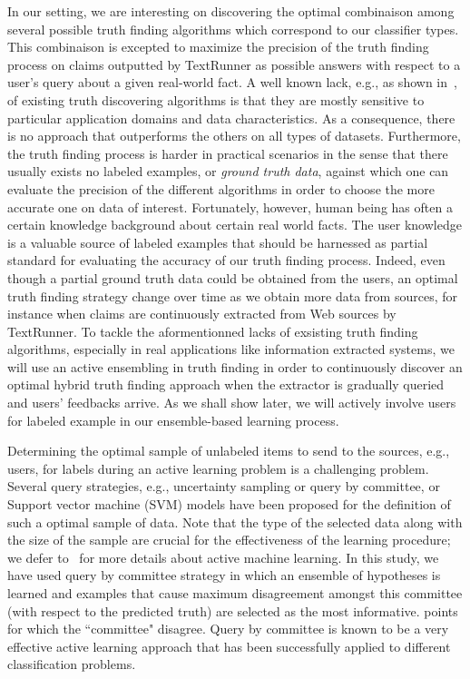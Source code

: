 In our setting, we are interesting on discovering the optimal combinaison among several possible truth finding algorithms
which correspond to our classifier types.
This combinaison is excepted to maximize the precision of the truth finding process on claims outputted by TextRunner as 
possible answers with respect to a user's query about a given real-world fact.
A well known lack, e.g., as shown in~\cite{Li12, Wagui14}, of existing truth discovering algorithms is that they are mostly sensitive
to particular application domains and data characteristics. As a consequence, there is no approach that outperforms the others on all 
types of datasets. Furthermore, the truth finding process is harder in practical scenarios in the sense that there usually exists
no labeled examples, or \emph{ground truth data}, against which one can evaluate the precision of the different algorithms in order to choose
the more accurate one on data of interest.  Fortunately, however, human being has often a certain knowledge background about certain real world facts.
The user knowledge is a valuable source of labeled examples that should be harnessed as partial standard for evaluating the accuracy of our truth finding 
process. Indeed, even though a partial ground truth data could be obtained from the users, an optimal truth finding strategy change over time as we obtain
more data from sources, for instance when claims are continuously extracted from Web sources by TextRunner.
To tackle the aformentionned lacks of exsisting truth finding algorithms, especially in real applications like information extracted systems, 
we will use an active ensembling in truth finding in order to continuously discover an optimal hybrid truth finding approach when the extractor is gradually
queried and users' feedbacks arrive. As we shall show later, we will actively involve users for labeled example in our ensemble-based learning process.

Determining the optimal sample of unlabeled items to send to the sources, e.g., users, for labels during an active learning problem is a challenging problem.
Several query strategies, e.g., uncertainty sampling or query by committee, or Support vector machine (SVM) models have been proposed for the definition of such a optimal sample of data. Note that 
the type of the selected data along with the size of the sample are crucial for the effectiveness of the learning procedure; we defer to~\cite{burr12} for more details about active machine learning. 
In this study, we have used query by committee strategy in which an ensemble of hypotheses is learned and examples that cause maximum disagreement amongst this
committee (with respect to the predicted truth) are selected as the most informative. 
points for which the ``committee" disagree. Query by committee is known to be a very effective active learning approach that has been successfully applied to different classification problems.

